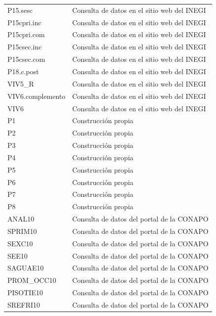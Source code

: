 \documentclass[paper=letter, fontsize=11pt]{scrartcl}
\numberwithin{equation}{section} %
\numberwithin{figure}{section} %
\numberwithin{table}{section} %
\begin{document}
\begin{enumerate}
\begin{enumerate}
\begin{table}[H]
\begin{tabular}{ll}
P15.sesc           	&	       Consulta de datos en el sitio web del INEGI\\
P15cpri.inc    	&	     Consulta de datos en el sitio web del INEGI\\
P15cpri.com    	&	      Consulta de datos en el sitio web del INEGI\\
P15csec.inc    	&	      Consulta de datos en el sitio web del INEGI\\
P15csec.com    	&	     Consulta de datos en el sitio web del INEGI\\
P18.c.post             	&	       Consulta de datos en el sitio web del INEGI\\
VIV5\_R 	&	      Consulta de datos en el sitio web del INEGI\\
VIV6.complemento          	&	       Consulta de datos en el sitio web del INEGI\\
VIV6    	&	       Consulta de datos en el sitio web del INEGI\\
P1       	&	       Construcción propia\\
P2             	&	     Construcción propia\\
P3             	&	 Construcción propia\\
P4             	&	       Construcción propia\\
P5             	&	       Construcción propia\\
P6             	&	       Construcción propia\\
P7             	&	      Construcción propia\\
P8             	&	     Construcción propia\\
ANAL10    	&	     Consulta de datos del portal de la CONAPO\\
SPRIM10           	&	              Consulta de datos del portal de la CONAPO\\
SEXC10    	&	     Consulta de datos del portal de la CONAPO\\
SEE10             	&	      Consulta de datos del portal de la CONAPO\\
SAGUAE10         	&	            Consulta de datos del portal de la CONAPO\\
PROM\_OCC10   	&	           Consulta de datos del portal de la CONAPO\\
PISOTIE10             	&	      Consulta de datos del portal de la CONAPO\\
SREFRI10             	&	     Consulta de datos del portal de la CONAPO\\
 \hline
\end{tabular}
\end{table}
%




\end{enumerate}
\end{enumerate}
\end{document}
